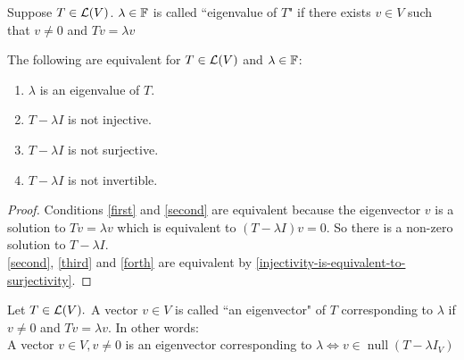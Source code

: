 \begin{mydef}
    Suppose $T\in \mathcal{L} (V)$. $\lambda \in \mathbb{F}$ is called ``eigenvalue of $T$" if there exists $v \in V$ such that $v \neq 0$ and $Tv = \lambda v$
\end{mydef}

\setcounter{thm}{6}
\begin{thm}
    \label{equivalent-conditions-to-be-an-eigenvalue}
    The following are equivalent for $T \in \mathcal{L}(V)$ and $\lambda \in \mathbb{F}$:
    \begin{enumerate}[label=(\alph*)]
        \item $\lambda$ is an eigenvalue of $T$. \label{first}
        \item $T-\lambda I$ is not injective. \label{second}
        \item $T-\lambda I$ is not surjective. \label{third}
        \item $T-\lambda I$ is not invertible. \label{forth}
    \end{enumerate}
\end{thm}
\begin{proof}
    Conditions \ref{first} and \ref{second} are equivalent because the eigenvector $v$ is a solution to $Tv=\lambda v$ which is equivalent to $(T-\lambda I)v=0$. So there is a non-zero solution to $T-\lambda I$. \\
    \ref{second}, \ref{third} and \ref{forth} are equivalent by \ref{injectivity-is-equivalent-to-surjectivity}.

\end{proof}

\setcounter{thm}{7}
\begin{thm}
    Let $T\in \mathcal{L}(V).$ A vector $v \in V$ is called ``an eigenvector" of $T$ corresponding to $\lambda$ if $v\neq 0$ and $Tv = \lambda v$.
    In other words:
    \\A vector $v\in V, v \neq 0$ is an eigenvector corresponding to $\lambda \iff v \in \operatorname{null}(T-\lambda I_V)$
\end{thm}

